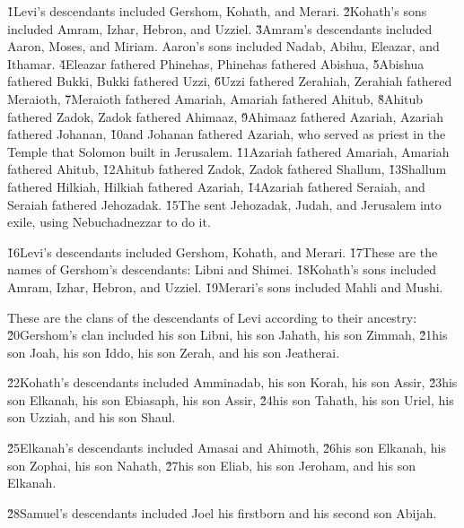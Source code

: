 \v{1}Levi's descendants included Gershom, Kohath, and Merari. \v{2}Kohath's sons included Amram, Izhar, Hebron, and Uzziel. \v{3}Amram's descendants included Aaron, Moses, and Miriam. Aaron's sons included Nadab, Abihu, Eleazar, and Ithamar. \v{4}Eleazar fathered Phinehas, Phinehas fathered Abishua, \v{5}Abishua fathered Bukki, Bukki fathered Uzzi, \v{6}Uzzi fathered Zerahiah, Zerahiah fathered Meraioth, \v{7}Meraioth fathered Amariah, Amariah fathered Ahitub, \v{8}Ahitub fathered Zadok, Zadok fathered Ahimaaz, \v{9}Ahimaaz fathered Azariah, Azariah fathered Johanan, \v{10}and Johanan fathered Azariah, who served as priest in the Temple that Solomon built in Jerusalem. \v{11}Azariah fathered Amariah, Amariah fathered Ahitub, \v{12}Ahitub fathered Zadok, Zadok fathered Shallum, \v{13}Shallum fathered Hilkiah, Hilkiah fathered Azariah, \v{14}Azariah fathered Seraiah, and Seraiah fathered Jehozadak. \v{15}The  sent Jehozadak, Judah, and Jerusalem into exile, using Nebuchadnezzar to do it.

\v{16}Levi's descendants included Gershom, Kohath, and Merari. \v{17}These are the names of Gershom's descendants: Libni and Shimei. \v{18}Kohath's sons included Amram, Izhar, Hebron, and Uzziel. \v{19}Merari's sons included Mahli and Mushi.

These are the clans of the descendants of Levi according to their ancestry: \v{20}Gershom's clan included his son Libni, his son Jahath, his son Zimmah, \v{21}his son Joah, his son Iddo, his son Zerah, and his son Jeatherai.

\v{22}Kohath's descendants included Amminadab, his son Korah, his son Assir, \v{23}his son Elkanah, his son Ebiasaph, his son Assir, \v{24}his son Tahath, his son Uriel, his son Uzziah, and his son Shaul.

\v{25}Elkanah's descendants included Amasai and Ahimoth, \v{26}his son Elkanah, his son Zophai, his son Nahath, \v{27}his son Eliab, his son Jeroham, and his son Elkanah.

\v{28}Samuel's descendants included Joel his firstborn and his second son Abijah.

